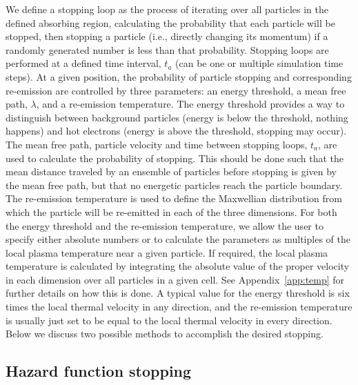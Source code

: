 \documentclass[../absorber.tex]{subfiles}
\begin{document}
We define a stopping loop as the process of iterating over all particles in the defined absorbing region, calculating the probability that each particle will be stopped, then stopping a particle (i.e., directly changing its momentum) if a randomly generated number is less than that probability.  Stopping loops are performed at a defined time interval, $t_a$ (can be one or multiple simulation time steps).  At a given position, the probability of particle stopping and corresponding re-emission are controlled by three parameters: an energy threshold, a mean free path, $\lambda$, and a re-emission temperature.  The energy threshold provides a way to distinguish between background particles (energy is below the threshold, nothing happens) and hot electrons (energy is above the threshold, stopping may occur).  The mean free path, particle velocity and time between stopping loops, $t_a$, are used to calculate the probability of stopping.  This should be done such that the mean distance traveled by an ensemble of particles before stopping is given by the mean free path, but that no energetic particles reach the particle boundary.  The re-emission temperature is used to define the Maxwellian distribution from which the particle will be re-emitted in each of the three dimensions.  For both the energy threshold and the re-emission temperature, we allow the user to specify either absolute numbers or to calculate the parameters as multiples of the local plasma temperature near a given particle.  If required, the local plasma temperature is calculated by integrating the absolute value of the proper velocity in each dimension over all particles in a given cell.  See Appendix~\ref{app:temp} for further details on how this is done.  A typical value for the energy threshold is six times the local thermal velocity in any direction, and the re-emission temperature is usually just set to be equal to the local thermal velocity in every direction.  Below we discuss two possible methods to accomplish the desired stopping.

\subsection{Hazard function stopping} \label{sec:hazard}
\end{document}
